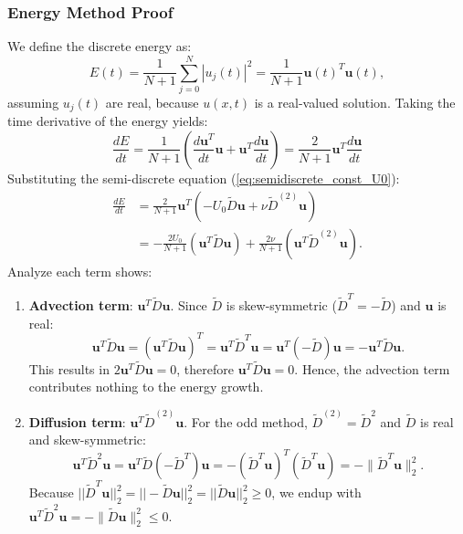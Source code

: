 \subsubsection{Energy Method Proof}
We define the discrete energy as:
\begin{equation}
	E(t) = \frac{1}{N+1} \sum_{j=0}^{N} |u_j(t)|^2 = \frac{1}{N+1} \mathbf{u}(t)^T \mathbf{u}(t),
	\label{eq:discrete_energy}
\end{equation}
assuming $u_j(t)$ are real, because $u(x,t)$ is a real-valued solution.
Taking the time derivative of the energy yields:
\begin{equation}
	\frac{dE}{dt} = \frac{1}{N+1} \left( \frac{d\mathbf{u}^T}{dt}\mathbf{u} + \mathbf{u}^T\frac{d\mathbf{u}}{dt} \right) = \frac{2}{N+1} \mathbf{u}^T \frac{d\mathbf{u}}{dt}
	\label{eq:dEdt_general}
\end{equation}
Substituting the semi-discrete equation (\ref{eq:semidiscrete_const_U0}):
\begin{equation}
	\begin{aligned}
		\frac{dE}{dt} & = \frac{2}{N+1} \mathbf{u}^T (-U_0 \tilde{D} \mathbf{u} + \nu \tilde{D}^{(2)} \mathbf{u})                             \\
		              & = -\frac{2U_0}{N+1} (\mathbf{u}^T \tilde{D} \mathbf{u}) + \frac{2\nu}{N+1} (\mathbf{u}^T \tilde{D}^{(2)} \mathbf{u}).
	\end{aligned}
	\label{eq:dEdt_substituted}
\end{equation}
Analyze each term shows:
\begin{enumerate}
	\item \textbf{Advection term}: $\mathbf{u}^T \tilde{D} \mathbf{u}$. Since $\tilde{D}$ is skew-symmetric ($\tilde{D}^T = -\tilde{D}$) and $\mathbf{u}$ is real:
	      \begin{equation}
		      \mathbf{u}^T \tilde{D} \mathbf{u} = (\mathbf{u}^T \tilde{D} \mathbf{u})^T = \mathbf{u}^T \tilde{D}^T \mathbf{u} = \mathbf{u}^T (-\tilde{D}) \mathbf{u} = -\mathbf{u}^T \tilde{D} \mathbf{u}.
	      \end{equation}
	      This results in $2 \mathbf{u}^T \tilde{D} \mathbf{u} = 0$, therefore $\mathbf{u}^T \tilde{D} \mathbf{u} = 0$. Hence, the advection term contributes nothing to the energy growth.
	\item \textbf{Diffusion term}: $\mathbf{u}^T \tilde{D}^{(2)} \mathbf{u}$. For the odd method, $\tilde{D}^{(2)} = \tilde{D}^2$ and $\tilde{D}$ is real and skew-symmetric:
	      \begin{equation}
		      \mathbf{u}^T \tilde{D}^2 \mathbf{u} = \mathbf{u}^T \tilde{D} (-\tilde{D}^T) \mathbf{u} = - (\tilde{D}^T\mathbf{u})^T (\tilde{D}^T\mathbf{u}) = -\|\tilde{D}^T\mathbf{u}\|_2^2.
	      \end{equation}
	      Because $||\tilde{D}^T\mathbf{u}||_2^2 = ||-\tilde{D}\mathbf{u}||_2^2 = ||\tilde{D}\mathbf{u}||_2^2 \ge 0$, we endup with $\mathbf{u}^T \tilde{D}^2 \mathbf{u} = -\|\tilde{D}\mathbf{u}\|_2^2 \leq 0$.
\end{enumerate}
